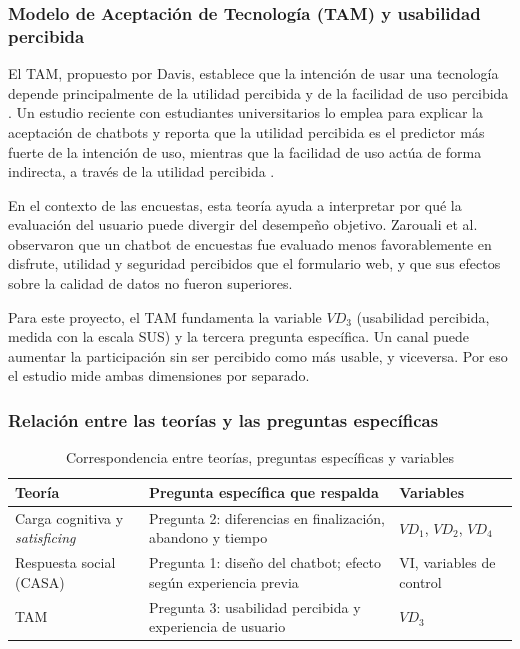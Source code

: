 \documentclass[12pt,letterpaper]{article}
\begin{document}
\subsubsection{Modelo de Aceptación de Tecnología (TAM) y usabilidad percibida}

El TAM, propuesto por Davis, establece que la intención de usar una tecnología depende principalmente de la utilidad percibida y de la facilidad de uso percibida \cite{davis1989}. Un estudio reciente con estudiantes universitarios lo emplea para explicar la aceptación de chatbots y reporta que la utilidad percibida es el predictor más fuerte de la intención de uso, mientras que la facilidad de uso actúa de forma indirecta, a través de la utilidad percibida \cite{tam2026}.

En el contexto de las encuestas, esta teoría ayuda a interpretar por qué la evaluación del usuario puede divergir del desempeño objetivo. Zarouali et al. \cite{zarouali2023} observaron que un chatbot de encuestas fue evaluado menos favorablemente en disfrute, utilidad y seguridad percibidos que el formulario web, y que sus efectos sobre la calidad de datos no fueron superiores.

Para este proyecto, el TAM fundamenta la variable $VD_3$ (usabilidad percibida, medida con la escala SUS) y la tercera pregunta específica. Un canal puede aumentar la participación sin ser percibido como más usable, y viceversa. Por eso el estudio mide ambas dimensiones por separado.

\subsubsection{Relación entre las teorías y las preguntas específicas}

\begin{table}[htbp]
\centering
\caption{Correspondencia entre teorías, preguntas específicas y variables}
\small
\begin{tabular}{|p{4cm}|p{4.5cm}|p{3.5cm}|}
\hline
\textbf{Teoría} & \textbf{Pregunta específica que respalda} & \textbf{Variables} \\ \hline
Carga cognitiva y \textit{satisficing} & Pregunta 2: diferencias en finalización, abandono y tiempo & $VD_1$, $VD_2$, $VD_4$ \\ \hline
Respuesta social (CASA) & Pregunta 1: diseño del chatbot; efecto según experiencia previa & VI, variables de control \\ \hline
TAM & Pregunta 3: usabilidad percibida y experiencia de usuario & $VD_3$ \\ \hline
\end{tabular}
\end{table}
\end{document}
